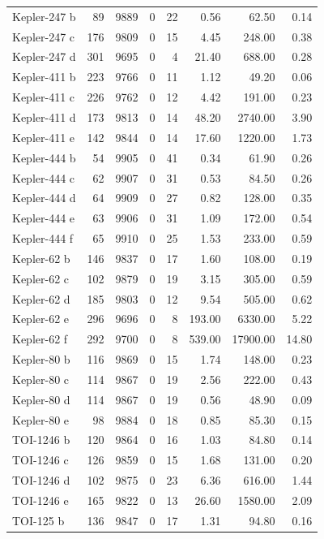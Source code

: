 \begin{table}
\begin{tabular}{lrrrrrrr}
Kepler-247 b & 89 & 9889 & 0 & 22 & 0.56 & 62.50 & 0.14 \\
Kepler-247 c & 176 & 9809 & 0 & 15 & 4.45 & 248.00 & 0.38 \\
Kepler-247 d & 301 & 9695 & 0 & 4 & 21.40 & 688.00 & 0.28 \\
Kepler-411 b & 223 & 9766 & 0 & 11 & 1.12 & 49.20 & 0.06 \\
Kepler-411 c & 226 & 9762 & 0 & 12 & 4.42 & 191.00 & 0.23 \\
Kepler-411 d & 173 & 9813 & 0 & 14 & 48.20 & 2740.00 & 3.90 \\
Kepler-411 e & 142 & 9844 & 0 & 14 & 17.60 & 1220.00 & 1.73 \\
Kepler-444 b & 54 & 9905 & 0 & 41 & 0.34 & 61.90 & 0.26 \\
Kepler-444 c & 62 & 9907 & 0 & 31 & 0.53 & 84.50 & 0.26 \\
Kepler-444 d & 64 & 9909 & 0 & 27 & 0.82 & 128.00 & 0.35 \\
Kepler-444 e & 63 & 9906 & 0 & 31 & 1.09 & 172.00 & 0.54 \\
Kepler-444 f & 65 & 9910 & 0 & 25 & 1.53 & 233.00 & 0.59 \\
Kepler-62 b & 146 & 9837 & 0 & 17 & 1.60 & 108.00 & 0.19 \\
Kepler-62 c & 102 & 9879 & 0 & 19 & 3.15 & 305.00 & 0.59 \\
Kepler-62 d & 185 & 9803 & 0 & 12 & 9.54 & 505.00 & 0.62 \\
Kepler-62 e & 296 & 9696 & 0 & 8 & 193.00 & 6330.00 & 5.22 \\
Kepler-62 f & 292 & 9700 & 0 & 8 & 539.00 & 17900.00 & 14.80 \\
Kepler-80 b & 116 & 9869 & 0 & 15 & 1.74 & 148.00 & 0.23 \\
Kepler-80 c & 114 & 9867 & 0 & 19 & 2.56 & 222.00 & 0.43 \\
Kepler-80 d & 114 & 9867 & 0 & 19 & 0.56 & 48.90 & 0.09 \\
Kepler-80 e & 98 & 9884 & 0 & 18 & 0.85 & 85.30 & 0.15 \\
TOI-1246 b & 120 & 9864 & 0 & 16 & 1.03 & 84.80 & 0.14 \\
TOI-1246 c & 126 & 9859 & 0 & 15 & 1.68 & 131.00 & 0.20 \\
TOI-1246 d & 102 & 9875 & 0 & 23 & 6.36 & 616.00 & 1.44 \\
TOI-1246 e & 165 & 9822 & 0 & 13 & 26.60 & 1580.00 & 2.09 \\
TOI-125 b & 136 & 9847 & 0 & 17 & 1.31 & 94.80 & 0.16 \\

\end{tabular}
\end{table}
